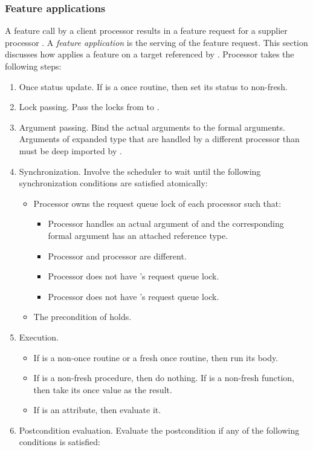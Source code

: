 \subsubsection{Feature applications}\label{sec:feature applications}
A feature call by a client processor  results in a feature request for a supplier processor . A \emph{feature application} is the serving of the feature request. This section discusses how  applies a feature  on a target referenced by . Processor  takes the following steps:
\begin{enumerate}
	\item Once status update. If  is a once routine, then set its status to non-fresh.
	\item Lock passing. Pass the locks from  to .
	\item Argument passing. Bind the actual arguments to the formal arguments. Arguments of expanded type that are handled by a different processor than  must be deep imported by .
	\item Synchronization. Involve the scheduler to wait until the following synchronization conditions are satisfied atomically:
		\begin{itemize}
			\item Processor  owns the request queue lock of each processor  such that:
				\begin{itemize}
					\item Processor  handles an actual argument of  and the corresponding formal argument has an attached reference type.
					\item Processor  and processor  are different.
					\item Processor  does not have 's request queue lock.
					\item Processor  does not have 's request queue lock.
				\end{itemize}
			\item The precondition of  holds.
		\end{itemize}
	\item Execution.
		\begin{itemize}
			\item If  is a non-once routine or a fresh once routine, then run its body.
			\item If  is a non-fresh procedure, then do nothing. If  is a non-fresh function, then take its once value as the result.
			\item If  is an attribute, then evaluate it.
		\end{itemize}
	\item Postcondition evaluation. Evaluate the postcondition if any of the following conditions is satisfied:

\end{enumerate}
